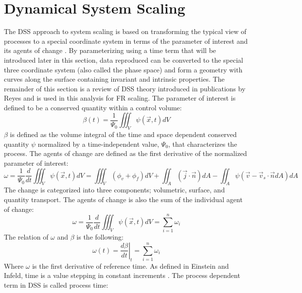 \section{Dynamical System Scaling}
\label{sec:dssdoc}

The DSS approach to system scaling is based on transforming the typical view of processes to a special coordinate system in terms of the parameter of interest and its agents of change \cite{DSS2015}.
By parameterizing using a time term that will be introduced later in this section, data reproduced can be converted to the special three coordinate system (also called the phase space)
and form a geometry with curves along the surface containing invariant and intrinsic properties. The remainder of this section is a review of DSS theory introduced in publications
by Reyes \cite{DSS2015,Reyes2015,Martin2019} and is used in this analysis for FR scaling. The parameter of interest is defined to be a conserved quantity within a control volume:
\begin{equation}
  \label{eq_1}
  \beta(t)=\frac{1}{\Psi_{0}}\iiint_{V}{\psi\left(\vec{x},t\right)}dV
\end{equation}
$\beta$ is defined as the volume integral of the time and space dependent conserved quantity $\psi$ normalized by a time-independent value, $\Psi_{0}$, that characterizes the process. The agents of change are defined as the first derivative of the normalized parameter of interest:
\begin{equation}
  \label{eq_2}
  \omega=\frac{1}{\Psi_{0}}\frac{d}{dt}\iiint_{V}{\psi\left(\vec{x},t\right)}dV=\iiint_{V}{\left(\phi_{v}+\phi_{f}\right)}dV+\iint_{A}{\left(\vec{j}\cdot\vec{n}\right)}dA-\iint_{A}{\psi\left(\vec{v}-\vec{v}_{s}\cdot\vec{n}dA\right)}dA
\end{equation}
The change is categorized into three components; volumetric, surface, and quantity transport. The agents of change is also the sum of the individual agent of change:
\begin{equation}
  \omega=\frac{1}{\Psi_{0}}\frac{d}{dt}\iiint_{V}{\psi\left(\vec{x},t\right)}dV=\sum^{n}_{i=1}{\omega_{i}}
\end{equation}
The relation of $\omega$ and $\beta$ is the following:
\begin{equation}
  \label{eq_3}
  \omega(t)=\left.\frac{d\beta}{dt}\right|_{t}=\sum^{n}_{i=1}{\omega_{i}}
\end{equation}
Where $\omega$ is the first derivative of reference time. As defined in Einstein and Infeld, time is a value stepping in constant increments \cite{Einstein1966}. The process dependent term in DSS is called process time:
